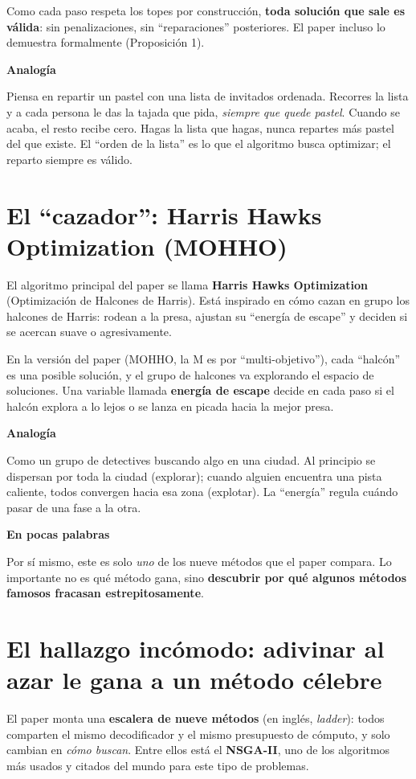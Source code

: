\documentclass[11pt]{article}
\newcommand{\cajacolor}{cajadato}
\newenvironment{caja}[2]{%
  \par\medskip\noindent
  \renewcommand{\cajacolor}{#1}%
  \begin{lrbox}{\cajabox}%
  \begin{minipage}{\dimexpr\linewidth-2\fboxsep-1.2em\relax}%
  \setlength{\parskip}{0.5em}%
  {\bfseries\color{acento2}#2}\par\smallskip}
  {\end{minipage}%
  \end{lrbox}%
  \setlength{\fboxsep}{0.6em}%
  \colorbox{\cajacolor}{\usebox{\cajabox}}\par\medskip}
\newcommand{\analogia}[1]{\begin{caja}{cajaanalogia}{Analogía}#1\end{caja}}
\newcommand{\enpocas}[1]{\begin{caja}{cajaclave}{En pocas palabras}#1\end{caja}}
\newcommand{\term}[1]{\textbf{\color{acento}#1}}
\begin{document}
Como cada paso respeta los topes por construcción, \textbf{toda solución que sale es válida}: sin penalizaciones, sin ``reparaciones'' posteriores. El paper incluso lo demuestra formalmente (Proposición 1).

\analogia{
Piensa en repartir un pastel con una lista de invitados ordenada. Recorres la lista y a cada persona le das la tajada que pida, \emph{siempre que quede pastel}. Cuando se acaba, el resto recibe cero. Hagas la lista que hagas, nunca repartes más pastel del que existe. El ``orden de la lista'' es lo que el algoritmo busca optimizar; el reparto siempre es válido.
}

\section{El ``cazador'': Harris Hawks Optimization (MOHHO)}

El algoritmo principal del paper se llama \term{Harris Hawks Optimization} (Optimización de Halcones de Harris). Está inspirado en cómo cazan en grupo los halcones de Harris: rodean a la presa, ajustan su ``energía de escape'' y deciden si se acercan suave o agresivamente.

En la versión del paper (MOHHO, la M es por ``multi-objetivo''), cada ``halcón'' es una posible solución, y el grupo de halcones va explorando el espacio de soluciones. Una variable llamada \term{energía de escape} decide en cada paso si el halcón explora a lo lejos o se lanza en picada hacia la mejor presa.

\analogia{
Como un grupo de detectives buscando algo en una ciudad. Al principio se dispersan por toda la ciudad (explorar); cuando alguien encuentra una pista caliente, todos convergen hacia esa zona (explotar). La ``energía'' regula cuándo pasar de una fase a la otra.
}

\enpocas{
Por sí mismo, este es solo \emph{uno} de los nueve métodos que el paper compara. Lo importante no es qué método gana, sino \textbf{descubrir por qué algunos métodos famosos fracasan estrepitosamente}.
}

\section{El hallazgo incómodo: adivinar al azar le gana a un método célebre}

El paper monta una \term{escalera de nueve métodos} (en inglés, \emph{ladder}): todos comparten el mismo decodificador y el mismo presupuesto de cómputo, y solo cambian en \emph{cómo buscan}. Entre ellos está el \term{NSGA-II}, uno de los algoritmos más usados y citados del mundo para este tipo de problemas.
\end{document}
